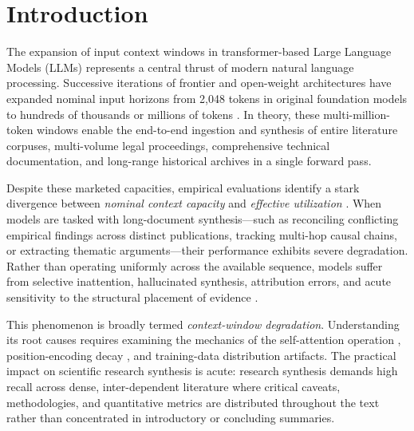 \documentclass[manuscript]{acmart}
\begin{document}


\maketitle

\section{Introduction}\label{sec:intro}
The expansion of input context windows in transformer-based Large Language Models (LLMs) represents a central thrust of modern natural language processing. Successive iterations of frontier and open-weight architectures have expanded nominal input horizons from 2,048 tokens in original foundation models to hundreds of thousands or millions of tokens \cite{vaswani2017attention,su2024roformer,chen2023interpolation}. In theory, these multi-million-token windows enable the end-to-end ingestion and synthesis of entire literature corpuses, multi-volume legal proceedings, comprehensive technical documentation, and long-range historical archives in a single forward pass.

Despite these marketed capacities, empirical evaluations identify a stark divergence between \emph{nominal context capacity} and \emph{effective utilization} \cite{liu2024lost,paulsen2025mecw}. When models are tasked with long-document synthesis---such as reconciling conflicting empirical findings across distinct publications, tracking multi-hop causal chains, or extracting thematic arguments---their performance exhibits severe degradation. Rather than operating uniformly across the available sequence, models suffer from selective inattention, hallucinated synthesis, attribution errors, and acute sensitivity to the structural placement of evidence \cite{liu2024lost,dai2024deniahl}.

This phenomenon is broadly termed \emph{context-window degradation}. Understanding its root causes requires examining the mechanics of the self-attention operation \cite{vaswani2017attention}, position-encoding decay \cite{press2022alibi,su2024roformer}, and training-data distribution artifacts. The practical impact on scientific research synthesis is acute: research synthesis demands high recall across dense, inter-dependent literature where critical caveats, methodologies, and quantitative metrics are distributed throughout the text rather than concentrated in introductory or concluding summaries.
\end{document}
